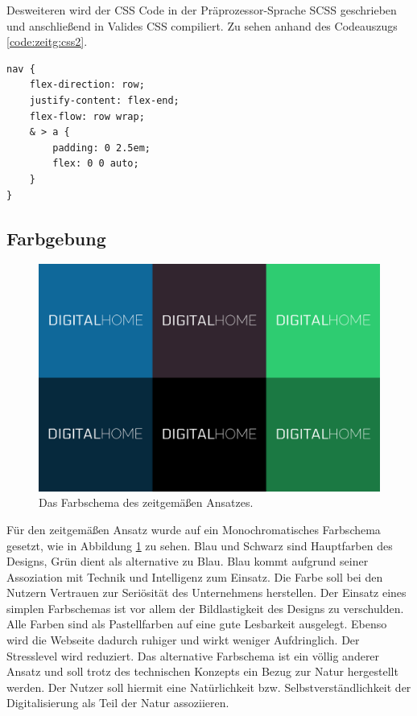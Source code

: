 Desweiteren wird der CSS Code in der Präprozessor-Sprache SCSS geschrieben und anschließend in Valides CSS compiliert. Zu sehen anhand des Codeauszugs \ref{code:zeitg:css2}.

\begin{lstlisting}[caption={Verschachtelung von CSS-Klassen in SCSS.}, label={code:zeitg:css2}]
nav {
	flex-direction: row;
	justify-content: flex-end;
	flex-flow: row wrap;
	& > a {
		padding: 0 2.5em;
		flex: 0 0 auto;
	}
}
\end{lstlisting}

\subsection{Farbgebung}
\begin{figure} [hp]
	\includegraphics[width=\textwidth]{./img/zeitg_farbschema1.png}
	\caption{Das Farbschema des zeitgemäßen Ansatzes.}
	\label{zeitg:farbschema}
\end{figure}

Für den zeitgemäßen Ansatz wurde auf ein Monochromatisches Farbschema gesetzt, wie in Abbildung \ref{zeitg:farbschema} zu sehen. Blau und Schwarz sind Hauptfarben des Designs, Grün dient als alternative zu Blau.
Blau kommt aufgrund seiner Assoziation mit Technik und Intelligenz zum Einsatz. Die Farbe soll bei den Nutzern Vertrauen zur Seriösität des Unternehmens herstellen. Der Einsatz eines simplen Farbschemas ist vor allem der Bildlastigkeit des Designs zu verschulden.
Alle Farben sind als Pastellfarben auf eine gute Lesbarkeit ausgelegt. Ebenso wird die Webseite dadurch ruhiger und wirkt weniger Aufdringlich. Der Stresslevel wird reduziert.
Das alternative Farbschema ist ein völlig anderer Ansatz und soll trotz des technischen Konzepts ein Bezug zur Natur hergestellt werden. Der Nutzer soll hiermit eine Natürlichkeit bzw. Selbstverständlichkeit der Digitalisierung als Teil der Natur assoziieren.

